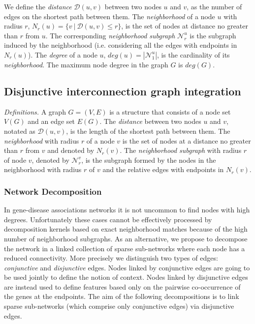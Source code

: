 We define the \textit{distance} $\mathcal{D}(u,v)$ between two nodes $u$ and $v$, as the number of edges on the shortest path between them. The \textit{neighborhood} of a node $u$ with radius $r$, $N_r(u) = \lbrace v\ |\ \mathcal{D}(u,v) \leq r \rbrace$, is the set of nodes at distance no greater than $r$ from $u$. The corresponding \textit{neighborhood subgraph} $\mathcal{N}_{r}^{u}$ is the  subgraph induced by the neighborhood (i.e. considering all the edges with endpoints in $N_r(u)$). The \textit{degree} of a node $u$, $deg(u) = |\mathcal{N}_{1}^{u}|$, is the cardinality of its \textit{neighborhood}. The maximum node degree in the graph $G$ is $deg(G)$.
\subsection{Disjunctive interconnection graph integration}
\textit{Definitions.} A graph $G = (V,E)$ is a structure that consists of a node set $V(G)$ and an edge set $E(G)$. The \textit{distance} between two nodes $u$ and $v$, notated as $\mathcal{D}(u,v)$, is the length of the shortest path between them. The \textit{neighborhood} with radius $r$ of a node $v$ is the set of nodes
at a distance no greater than $r$ from $v$ and denoted by $N_r(v)$. The \textit{neighborhood subgraph} with radius $r$ of node $v$, denoted by $\mathcal{N}_{r}^{v}$,  is the subgraph formed by the nodes in the
neighborhood with radius $r$ of $v$ and the relative edges with endpoints in $N_r(v)$.

\subsubsection*{Network Decomposition} 
In gene-disease associations networks it is not uncommon to find nodes with high degrees. Unfortunately these cases cannot be effectively processed by decomposition kernels based on exact neighborhood matches
because of the high number of neighborhood subgraphs. As an alternative, we propose to decompose the network in a linked collection of sparse sub-networks where each node has a reduced connectivity. More precisely we distinguish two types of edges: {\em conjunctive} and {\em disjunctive} edges. Nodes linked by conjunctive edges are going to be used jointly to define the notion of context. Nodes linked by disjunctive edges are instead used to define features based only on the
pairwise co-occurrence of the genes at the endpoints. The aim of the following decompositions is to link sparse sub-networks (which comprise only conjunctive edges) via disjunctive edges. 

